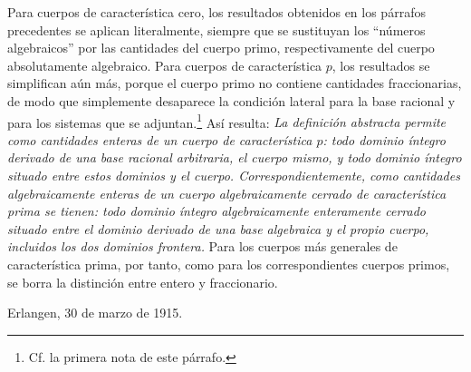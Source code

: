Para cuerpos de característica cero, los resultados obtenidos en los párrafos precedentes se aplican literalmente, siempre que se sustituyan los ``números algebraicos'' por las cantidades del cuerpo primo, respectivamente del cuerpo absolutamente algebraico. Para cuerpos de característica $p$, los resultados se simplifican aún más, porque el cuerpo primo no contiene cantidades fraccionarias, de modo que simplemente desaparece la condición lateral para la base racional y para los sistemas que se adjuntan.\footnote{Cf. la primera nota de este párrafo.} Así resulta: \emph{La definición abstracta permite como cantidades enteras de un cuerpo de característica $p$: todo dominio íntegro derivado de una base racional arbitraria, el cuerpo mismo, y todo dominio íntegro situado entre estos dominios y el cuerpo. Correspondientemente, como cantidades algebraicamente enteras de un cuerpo algebraicamente cerrado de característica prima se tienen: todo dominio íntegro algebraicamente enteramente cerrado situado entre el dominio derivado de una base algebraica y el propio cuerpo, incluidos los dos dominios frontera.} Para los cuerpos más generales de característica prima, por tanto, como para los correspondientes cuerpos primos, se borra la distinción entre entero y fraccionario.

\medskip
\noindent Erlangen, 30 de marzo de 1915.

\clearpage
